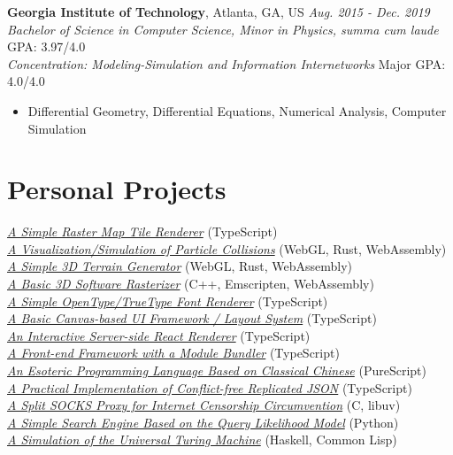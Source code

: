 \documentclass[12pt]{article}
\begin{document}
\textbf{Georgia Institute of Technology}, Atlanta, GA, US \hfill \textit{Aug. 2015 - Dec. 2019}\\
\textit{Bachelor of Science in Computer Science, Minor in Physics, \textit{summa cum laude}} \hfill GPA: 3.97/4.0\\
\textit{Concentration: Modeling-Simulation and Information Internetworks} \hfill Major GPA: 4.0/4.0
\begin{itemize}
\small
\item Differential Geometry, Differential Equations, Numerical Analysis, Computer Simulation
\end{itemize}

\section*{Personal Projects}
\href{https://galmungral.github.io/mercator}{\textit{A Simple Raster Map Tile Renderer}} \hfill (TypeScript) \\
\href{https://galmungral.github.io/particle-simulation}{\textit{A Visualization/Simulation of Particle Collisions}} 
\hfill (WebGL, Rust, WebAssembly) \\
\href{https://galmungral.github.io/terrain-generator}{\textit{A Simple 3D Terrain Generator}} \hfill (WebGL, Rust, WebAssembly) \\
\href{https://galmungral.github.io/rasterizer?file=billboard.txt}{\textit{A Basic 3D Software Rasterizer}} \hfill (C++, Emscripten, WebAssembly) \\
\href{https://galmungral.github.io/text2svg}{\textit{A Simple OpenType/TrueType Font Renderer}} \hfill (TypeScript) \\
\href{https://galmungral.github.io/michelangelo}{\textit{A Basic Canvas-based UI Framework / Layout System}} \hfill (TypeScript) \\
\href{https://github.com/galmungral/react-teletype}{\textit{An Interactive Server-side React Renderer}} \hfill (TypeScript) \\
\href{https://github.com/galmungral/replay}{\textit{A Front-end Framework with a Module Bundler}} \hfill (TypeScript) \\
\href{https://galmungral.github.io/hanbun-lang}{\textit{An Esoteric Programming Language Based on Classical Chinese}} \hfill (PureScript) \\
\href{https://github.com/galmungral/json-crdt}{\textit{A Practical Implementation of Conflict-free Replicated JSON}} \hfill (TypeScript) \\
\href{https://github.com/galmungral/telescope}{\textit{A Split SOCKS Proxy for Internet Censorship Circumvention}} \hfill (C, libuv) \\
\href{https://github.com/galmungral/plato}{\textit{A Simple Search Engine Based on the Query Likelihood Model}} \hfill (Python) \\
\href{https://github.com/galmungral/turing-machine}{\textit{A Simulation of the Universal Turing Machine}} \hfill (Haskell, Common Lisp)
\end{document}
